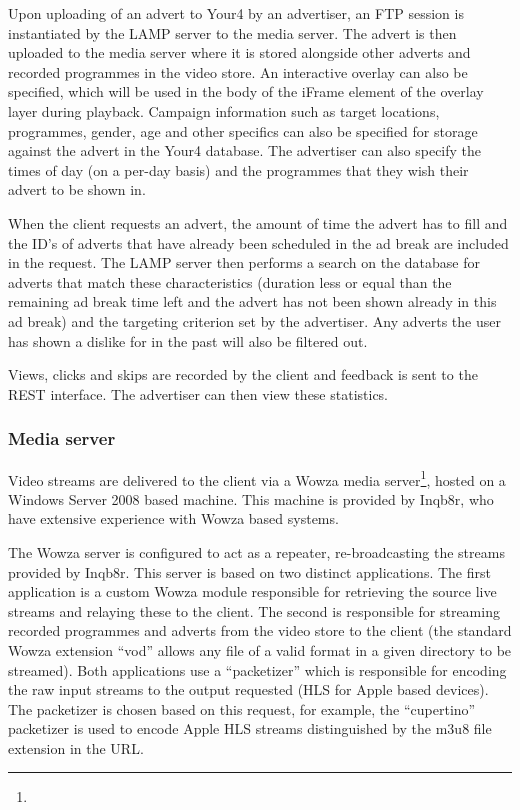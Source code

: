 Upon uploading of an advert to Your4 by an advertiser, an FTP session is instantiated by the LAMP server to the media server. The advert is then uploaded to the media server where it is stored alongside other adverts and recorded programmes in the video store. An interactive overlay can also be specified, which will be used in the body of the iFrame element of the overlay layer during playback. Campaign information such as target locations, programmes, gender, age and other specifics can also be specified for storage against the advert in the Your4 database. The advertiser can also specify the times of day (on a per-day basis) and the programmes that they wish their advert to be shown in.

When the client requests an advert, the amount of time the advert has to fill and the ID's of adverts that have already been scheduled in the ad break are included in the request. The LAMP server then performs a search on the database for adverts that match these characteristics (duration less or equal than the remaining ad break time left and the advert has not been shown already in this ad break) and the targeting criterion set by the advertiser. Any adverts the user has shown a dislike for in the past will also be filtered out.

Views, clicks and skips are recorded by the client and feedback is sent to the REST interface. The advertiser can then view these statistics.

\subsubsection{Media server}

Video streams are delivered to the client via a Wowza media server\footnote{}, hosted on a Windows Server 2008 based machine. This machine is provided by Inqb8r, who have extensive experience with Wowza based systems.

The Wowza server is configured to act as a repeater, re-broadcasting the streams provided by Inqb8r. This server is based on two distinct applications. The first application is a custom Wowza module responsible for retrieving the source live streams and relaying these to the client. The second is responsible for streaming recorded programmes and adverts from the video store to the client (the standard Wowza extension ``vod'' allows any file of a valid format in a given directory to be streamed). Both applications use a ``packetizer'' which is responsible for encoding the raw input streams to the output requested (HLS for Apple based devices). The packetizer is chosen based on this request, for example, the ``cupertino'' packetizer is used to encode Apple HLS streams distinguished by the m3u8 file extension in the URL.

